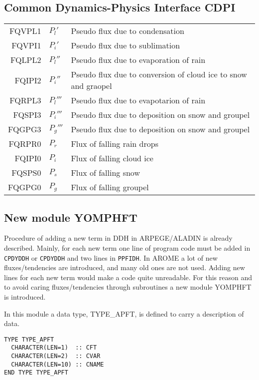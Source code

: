 \subsection{Common Dynamics-Physics Interface CDPI}

  \begin{tabular}{rll}
      FQVPL1       & $P_l'$ &Pseudo flux due to condensation\\
      FQVPI1       & $P_i'$ &Pseudo flux due to sublimation\\
      FQLPL2       & $P_l''$ & Pseudo flux due to evaporation of rain\\
      FQIPI2       & $P_i''$ &Pseudo flux due to conversion of cloud ice to snow and graopel\\
      FQRPL3       & $P_l'''$&Pseudo flux due to evapotarion of rain\\
      FQSPI3       & $P_i'''$&Pseudo flux due to deposition on snow and groupel\\
      FQGPG3       & $P_g'''$&Pseudo flux due to deposition on snow and groupel\\
      FQRPR0       & $P_r$ &Flux of falling rain drops\\
      FQIPI0       & $P_i$ &Flux of falling cloud ice\\
      FQSPS0       & $P_s$ &Flux of falling snow\\
      FQGPG0       & $P_g$ &Flux of falling groupel\\
  \end{tabular}

\subsection{New module YOMPHFT}
\label{yomphft}
Procedure of adding a new term in DDH in ARPEGE/ALADIN is already described. Mainly, for each new term one line of program code must be added in {\tt CPDYDDH} or {\tt CPDYDDH} and two lines in {\tt PPFIDH}. In AROME a lot of new fluxes/tendencies are introduced, and many old ones are not used. Adding new lines for each new term would make a code quite unreadable. For this reason and to avoid caring fluxes/tendencies through subroutines a new module YOMPHFT is introduced. 

In this module a data type, TYPE\_APFT, is defined to carry a description of data.

\begin{verbatim}
TYPE TYPE_APFT
  CHARACTER(LEN=1)  :: CFT
  CHARACTER(LEN=2)  :: CVAR
  CHARACTER(LEN=10) :: CNAME
END TYPE TYPE_APFT
\end{verbatim}

